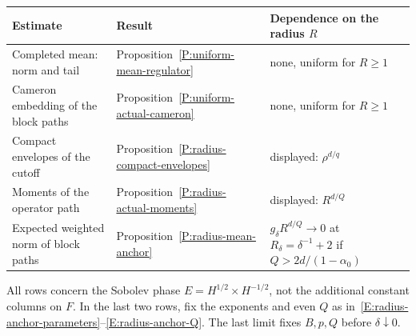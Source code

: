 \begin{center}
\small
\begin{tabular}{@{}p{}p{}p{}@{}}
  \toprule
  Estimate & Result & Dependence on the radius $R$ \\
  \midrule
  Completed mean: norm and tail & Proposition~\ref{P:uniform-mean-regulator} & none, uniform for $R\ge1$ \\
  Cameron embedding of the block paths & Proposition~\ref{P:uniform-actual-cameron} & none, uniform for $R\ge1$ \\
  \midrule
  Compact envelopes of the cutoff & Proposition~\ref{P:radius-compact-envelopes} & displayed: $\rho^{d/q}$ \\
  Moments of the operator path & Proposition~\ref{P:radius-actual-moments} & displayed: $R^{d/Q}$ \\
  \raggedright Expected weighted norm of block paths & Proposition~\ref{P:radius-mean-anchor} & $g_\delta R^{d/Q}\to0$ at $R_\delta=\delta^{-1}+2$ if $Q>2d/(1-\alpha_0)$ \\
  \bottomrule
\end{tabular}

\smallskip
\begin{minipage}{0.92\textwidth}\footnotesize
  All rows concern the Sobolev phase $E=H^{1/2}\times H^{-1/2}$, not the
  additional constant columns on $F$. In the last two rows, fix the exponents
  and even $Q$ as in~\eqref{E:radius-anchor-parameters}--\eqref{E:radius-anchor-Q}.
  The last limit fixes $B,p,Q$ before $\delta\downarrow0$.
\end{minipage}
\end{center}
